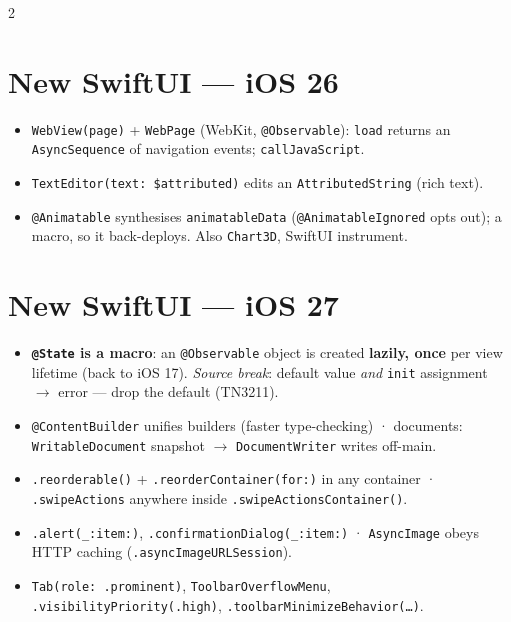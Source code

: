 \documentclass[8pt]{extarticle}
\begin{document}
\begin{multicols}{2}
\section{New SwiftUI — iOS 26}
\begin{itemize}
  \item \texttt{WebView(page)} + \texttt{WebPage} (WebKit, \texttt{@Observable}): \texttt{load}
        returns an \texttt{AsyncSequence} of navigation events; \texttt{callJavaScript}.
  \item \texttt{TextEditor(text: \$attributed)} edits an \texttt{AttributedString} (rich text).
  \item \texttt{@Animatable} synthesises \texttt{animatableData} (\texttt{@AnimatableIgnored}
        opts out); a macro, so it back-deploys. Also \texttt{Chart3D}, SwiftUI instrument.
\end{itemize}

\section{New SwiftUI — iOS 27}
\begin{itemize}
  \item \textbf{\texttt{@State} is a macro}: an \texttt{@Observable} object is created
        \textbf{lazily, once} per view lifetime (back to iOS 17). \emph{Source break}: default
        value \emph{and} \texttt{init} assignment $\to$ error — drop the default (TN3211).
  \item \texttt{@ContentBuilder} unifies builders (faster type-checking) · documents:
        \texttt{WritableDocument} snapshot $\to$ \texttt{DocumentWriter} writes off-main.
  \item \texttt{.reorderable()} + \texttt{.reorderContainer(for:)} in any container ·
        \texttt{.swipeActions} anywhere inside \texttt{.swipeActionsContainer()}.
  \item \texttt{.alert(\_:item:)}, \texttt{.confirmationDialog(\_:item:)} · \texttt{AsyncImage}
        obeys HTTP caching (\texttt{.asyncImageURLSession}).
  \item \texttt{Tab(role: .prominent)}, \texttt{ToolbarOverflowMenu},
        \texttt{.visibilityPriority(.high)}, \texttt{.toolbarMinimizeBehavior(\ldots)}.
\end{itemize}


\end{multicols}

\end{document}
